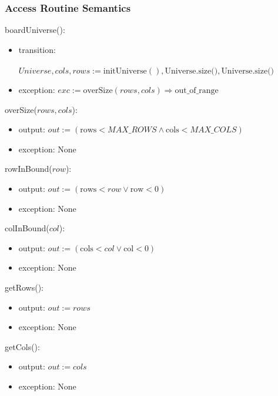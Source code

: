\documentclass[12pt]{article}
\begin{document}
\subsubsection* {Access Routine Semantics}

\noindent boardUniverse():
\begin{itemize}
\item transition: 
\\
\\$Universe, cols, rows := \text{initUniverse}(), \text{Universe}.\text{size()}, \text{Universe}.\text{size()}$
\item exception: $exc := \text{overSize}(rows, cols) \Rightarrow \text{out\_of\_range}$
\end{itemize}

\newpage

\noindent overSize($rows, cols$):
\begin{itemize}
\item output: $out := (\text{rows} < MAX\_ROWS \land \text{cols} < MAX\_COLS)$

\item exception: None
\end{itemize}

\noindent rowInBound($row$):
\begin{itemize}
\item output: $out := (\text{rows} < row \lor \text{row} < 0)$

\item exception: None
\end{itemize}

\noindent colInBound($col$):
\begin{itemize}
\item output: $out := (\text{cols} < col \lor \text{col} < 0)$

\item exception: None
\end{itemize}

\noindent getRows():
\begin{itemize}
\item output: $out := rows$

\item exception: None
\end{itemize}

\noindent getCols():
\begin{itemize}
\item output: $out := cols$

\item exception: None
\end{itemize}
\end{document}
